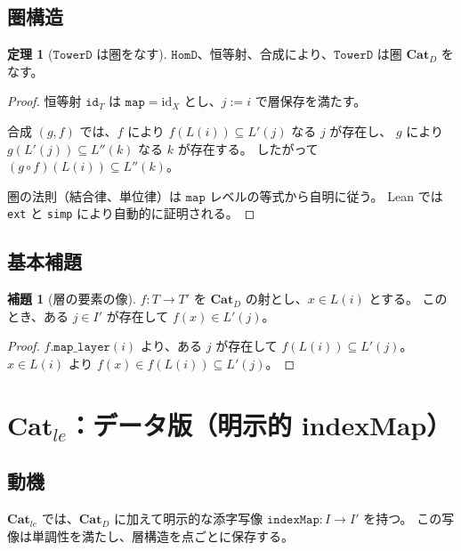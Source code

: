 \documentclass{ltjsarticle}
\theoremstyle{definition}
\newtheorem{theorem}[definition]{定理}
\newtheorem{lemma}[definition]{補題}
\newcommand{\catD}{\mathbf{Cat}_D}
\newcommand{\catle}{\mathbf{Cat}_{le}}
\newcommand{\TowerD}{\mathtt{TowerD}}
\newcommand{\HomD}{\mathtt{HomD}}
\newcommand{\indexMap}{\mathtt{indexMap}}
\begin{document}
\subsection{圏構造}

\begin{theorem}[$\TowerD$ は圏をなす]
$\HomD$、恒等射、合成により、$\TowerD$ は圏 $\catD$ をなす。
\end{theorem}

\begin{proof}
恒等射 $\mathtt{id}_T$ は $\mathtt{map} = \mathrm{id}_X$ とし、$j := i$ で層保存を満たす。

合成 $(g, f)$ では、$f$ により $f(L(i)) \subseteq L'(j)$ なる $j$ が存在し、
$g$ により $g(L'(j)) \subseteq L''(k)$ なる $k$ が存在する。
したがって $(g \circ f)(L(i)) \subseteq L''(k)$。

圏の法則（結合律、単位律）は $\mathtt{map}$ レベルの等式から自明に従う。
Lean では \texttt{ext} と \texttt{simp} により自動的に証明される。
\end{proof}

\subsection{基本補題}

\begin{lemma}[層の要素の像]
$f : T \to T'$ を $\catD$ の射とし、$x \in L(i)$ とする。
このとき、ある $j \in I'$ が存在して $f(x) \in L'(j)$。
\end{lemma}

\begin{proof}
$f.\mathtt{map\_layer}(i)$ より、ある $j$ が存在して $f(L(i)) \subseteq L'(j)$。
$x \in L(i)$ より $f(x) \in f(L(i)) \subseteq L'(j)$。
\end{proof}

\section{$\catle$：データ版（明示的 indexMap）}

\subsection{動機}

$\catle$ では、$\catD$ に加えて明示的な添字写像 $\indexMap : I \to I'$ を持つ。
この写像は単調性を満たし、層構造を点ごとに保存する。
\end{document}
